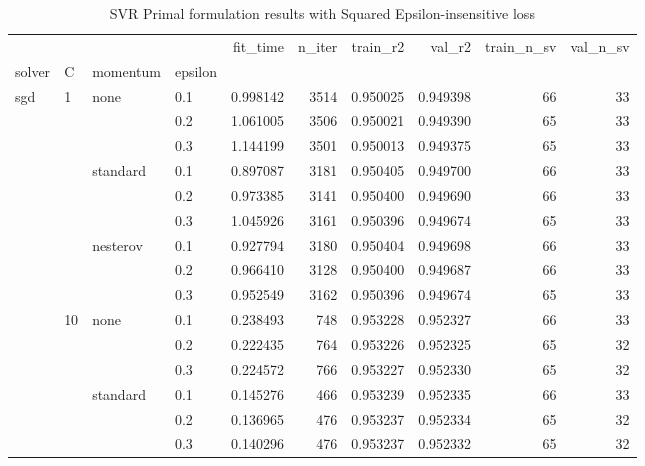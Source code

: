 \begin{table}[H]
\centering
\caption{SVR Primal formulation results with Squared Epsilon-insensitive loss}
\label{primal_svr_squared_eps_cv_results}
\begin{tabular}{llllrrrrrr}
\toprule
          &     &   &     &  fit\_time &  n\_iter &  train\_r2 &    val\_r2 &  train\_n\_sv &  val\_n\_sv \\
solver & C & momentum & epsilon &           &         &           &           &             &           \\
\midrule
sgd & 1   & none & 0.1 &  0.998142 &    3514 &  0.950025 &  0.949398 &          66 &        33 \\
          &     &   & 0.2 &  1.061005 &    3506 &  0.950021 &  0.949390 &          65 &        33 \\
          &     &   & 0.3 &  1.144199 &    3501 &  0.950013 &  0.949375 &          65 &        33 \\
          &     & standard & 0.1 &  0.897087 &    3181 &  0.950405 &  0.949700 &          66 &        33 \\
          &     &   & 0.2 &  0.973385 &    3141 &  0.950400 &  0.949690 &          66 &        33 \\
          &     &   & 0.3 &  1.045926 &    3161 &  0.950396 &  0.949674 &          65 &        33 \\
          &     & nesterov & 0.1 &  0.927794 &    3180 &  0.950404 &  0.949698 &          66 &        33 \\
          &     &   & 0.2 &  0.966410 &    3128 &  0.950400 &  0.949687 &          66 &        33 \\
          &     &   & 0.3 &  0.952549 &    3162 &  0.950396 &  0.949674 &          65 &        33 \\
          & 10  & none & 0.1 &  0.238493 &     748 &  0.953228 &  0.952327 &          66 &        33 \\
          &     &   & 0.2 &  0.222435 &     764 &  0.953226 &  0.952325 &          65 &        32 \\
          &     &   & 0.3 &  0.224572 &     766 &  0.953227 &  0.952330 &          65 &        32 \\
          &     & standard & 0.1 &  0.145276 &     466 &  0.953239 &  0.952335 &          66 &        33 \\
          &     &   & 0.2 &  0.136965 &     476 &  0.953237 &  0.952334 &          65 &        32 \\
          &     &   & 0.3 &  0.140296 &     476 &  0.953237 &  0.952332 &          65 &        32 \\

\end{tabular}
\end{table}

